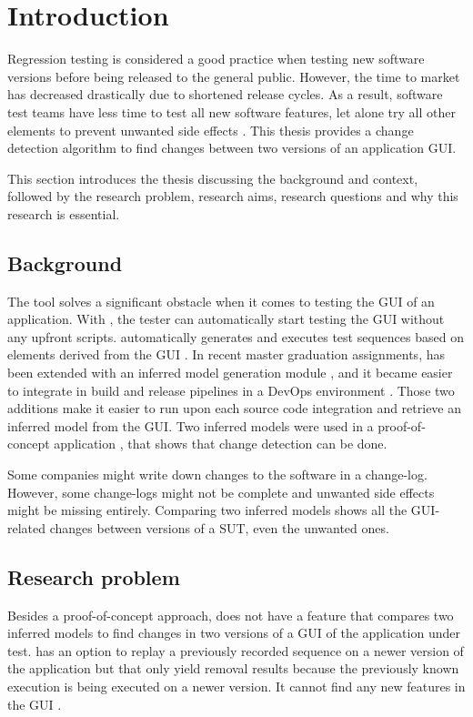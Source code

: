 \chapter{Introduction} \label{chapter:introduction}

Regression testing is considered a good practice when testing new software versions before being released to the general public. 
However, the time to market has decreased drastically due to shortened release cycles. As a result, software test teams have less time to test all new software features, let alone try all other elements to prevent unwanted side effects \cite{rapid-release-cycle-issues}.
This thesis provides a change detection algorithm to find changes between two versions of an application GUI. 

This section introduces the thesis discussing the background and context, followed by the research problem, research aims, research questions and why this research is essential.

\section{Background}
The \testar tool solves a significant obstacle when it comes to testing the GUI of an application. With \testar, the tester can automatically start testing the GUI without any upfront scripts. \testar automatically generates and executes test sequences based on elements derived from the GUI \cite{VosAho2021}. In recent master graduation assignments, \testar has been extended with an inferred model generation module \cite{thesisMulders}, and it became easier to integrate \testar in build and release pipelines in a DevOps environment \cite{thesisSlomp}. Those two additions make it easier to run \testar upon each source code integration and retrieve an inferred model from the GUI. Two inferred models were used in a proof-of-concept application \cite{stateDiff}, that shows that change detection can be done. 

Some companies might write down changes to the software in a change-log. However, some change-logs might not be complete and unwanted side effects might be missing entirely. Comparing two inferred models shows all the GUI-related changes between versions of a SUT, even the unwanted ones.

\section{Research problem}
Besides a proof-of-concept approach, \testar does not have a feature that compares two inferred models to find changes in two versions of a GUI of the application under test. \testar has an option to replay a previously recorded sequence \cite{testar-manual} on a newer version of the application but that only yield removal results because the previously known execution is being executed on a newer version. It cannot find any new features in the GUI \cite{VosAho2021}.


